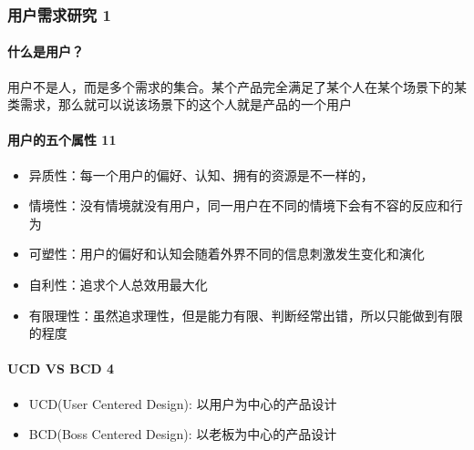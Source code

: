 \documentclass[letterpaper,11pt,english]{sphinxmanual}
\begin{document}
\subsubsection{用户需求研究 1\sphinxfootnotemark[151]}
\label{\detokenize{chapter_skill/users_analysis:id1}}\label{\detokenize{chapter_skill/users_analysis::doc}}%
\begin{footnotetext}[151]\sphinxAtStartFootnote
{}
%
\end{footnotetext}\ignorespaces 

\paragraph{什么是用户？}
\label{\detokenize{chapter_skill/users_analysis:id2}}
用户不是人，而是多个需求的集合。某个产品完全满足了某个人在某个场景下的某类需求，那么就可以说该场景下的这个人就是产品的一个用户


\paragraph{用户的五个属性 11\sphinxfootnotemark[152]}
\label{\detokenize{chapter_skill/users_analysis:id3}}%
\begin{footnotetext}[152]\sphinxAtStartFootnote
{}
%
\end{footnotetext}\ignorespaces \begin{itemize}
\item {} 
异质性：每一个用户的偏好、认知、拥有的资源是不一样的，

\item {} 
情境性：没有情境就没有用户，同一用户在不同的情境下会有不容的反应和行为

\item {} 
可塑性：用户的偏好和认知会随着外界不同的信息刺激发生变化和演化

\item {} 
自利性：追求个人总效用最大化

\item {} 
有限理性：虽然追求理性，但是能力有限、判断经常出错，所以只能做到有限的程度

\end{itemize}


\paragraph{UCD VS BCD 4\sphinxfootnotemark[153]}
\label{\detokenize{chapter_skill/users_analysis:ucd-vs-bcd-4}}%
\begin{footnotetext}[153]\sphinxAtStartFootnote
{}
%
\end{footnotetext}\ignorespaces \begin{itemize}
\item {} 
UCD(User Centered Design): 以用户为中心的产品设计

\item {} 
BCD(Boss Centered Design): 以老板为中心的产品设计

\end{itemize}
\end{document}
